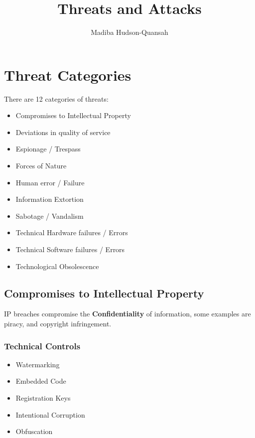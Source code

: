 \documentclass[12pt letter]{report}
\title{\Huge{Threats and Attacks}}
\author{\huge{Madiba Hudson-Quansah}}
\date{}
\begin{document}
\maketitle
\newpage
{}
\tableofcontents
\pagebreak

\chapter{Threat Categories}


There are 12 categories of threats:
\begin{itemize}
  \item Compromises to Intellectual Property
  \item Deviations in quality of service
  \item Espionage / Trespass
  \item Forces of Nature
  \item Human error / Failure
  \item Information Extortion
  \item Sabotage / Vandalism
  \item Technical Hardware failures / Errors
  \item Technical Software failures / Errors
  \item Technological Obsolescence
\end{itemize}

\section{Compromises to Intellectual Property}


IP breaches compromise the \textbf{Confidentiality} of information, some examples are piracy, and copyright infringement.

\subsection{Technical Controls}

\begin{itemize}
  \item Watermarking
  \item Embedded Code
  \item Registration Keys
  \item Intentional Corruption
  \item Obfuscation
\end{itemize}
\end{document}
